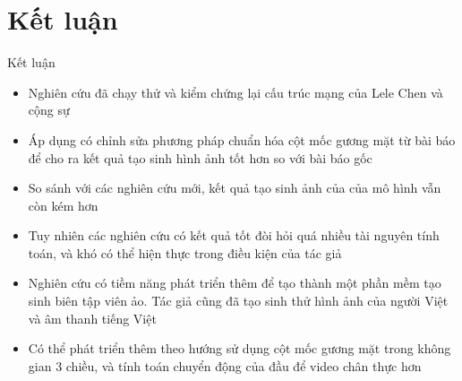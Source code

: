 \section{Kết luận}\label{sec:conclusion}
\frame{\tableofcontents[currentsection]}
\begin{frame}{Kết luận}
\begin{itemize}
    \item Nghiên cứu đã chạy thử và kiểm chứng lại cấu trúc mạng của Lele Chen và cộng sự \cite{chen2019}
    \item Áp dụng có chỉnh sửa phương pháp chuẩn hóa cột mốc gương mặt từ bài báo \cite{gen_face_landmark} để cho ra kết quả tạo sinh hình ảnh tốt hơn so với bài báo gốc
    \item So sánh với các nghiên cứu mới, kết quả tạo sinh ảnh của của mô hình vẫn còn kém hơn
    \item Tuy nhiên các nghiên cứu có kết quả tốt đòi hỏi quá nhiều tài nguyên tính toán, và khó có thể hiện thực trong điều kiện của tác giả
    \item Nghiên cứu có tiềm năng phát triển thêm để tạo thành một phần mềm tạo sinh biên tập viên ảo. Tác giả cũng đã tạo sinh thử hình ảnh của người Việt và âm thanh tiếng Việt
    \item Có thể phát triển thêm theo hướng sử dụng cột mốc gương mặt trong không gian 3 chiều, và tính toán chuyển động của đầu để video chân thực hơn
\end{itemize}
\end{frame}